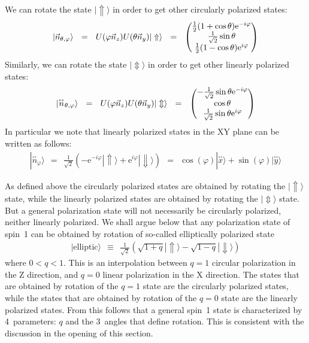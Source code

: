 \documentclass[onecolumn,fleqn, 11pt]{revtex4}
\newcommand{\vecm}[1]{\overset{{}_{\leftrightarrow}}{#1}}
\newcommand{\eexp}{\mathrm{e}^}
\newcommand{\amatrix}[1]{\begin{matrix} #1 \end{matrix}}
\newcommand{\beq}{\begin{eqnarray}}
\newcommand{\eeq}{\end{eqnarray}}
\begin{document}
We can rotate the state ${| \Uparrow \rangle }$ 
in order to get other circularly polarized states:
\beq
|\vec{n}_{\theta,\varphi}\rangle 
\ \ = \ \ U( \varphi \vec{n}_z) U(\theta \vec{n}_y) | \Uparrow \rangle 
\ \ = \ \ \left( 
\amatrix{ 
\frac{1}{2}(1+\cos \theta) \eexp{-i \varphi} \cr 
\frac{1}{\sqrt{2}}\sin \theta \cr 
\frac{1}{2}(1-\cos \theta) \eexp{i \varphi} } 
\right) 
\eeq
Similarly, we can rotate the state ${| \Updownarrow \rangle }$ 
in order to get other linearly polarized states:
\beq
|\vecm{n}_{\theta,\varphi}\rangle
\ \ = \ \ U( \varphi \vec{n}_z) U(\theta \vec{n}_y) | \Updownarrow \rangle 
\ \ = \ \ \left(\amatrix{ 
-\frac{1}{\sqrt{2}}\sin \theta \eexp{-i \varphi} \cr 
\cos \theta \cr 
\frac{1}{\sqrt{2}}\sin \theta \eexp{i \varphi} } 
\right) 
\eeq
In particular we note that linearly polarized states in the XY plane 
can be written as follows:
\beq
|\vecm{n}_{\varphi}\rangle
\ \ = \ \ \frac{1}{\sqrt{2}}(- \eexp{-i \varphi} | \Uparrow \rangle + \eexp{i \varphi} | \Downarrow \rangle ) 
\ \ = \ \ \cos(\varphi) | \vecm{x} \rangle + \sin(\varphi) | \vecm{y} \rangle 
\eeq 



As defined above the circularly polarized states 
are obtained by rotating the ${| \Uparrow \rangle}$  
state, while the linearly polarized states are obtained 
by rotating the ${| \Updownarrow \rangle}$ state.
But a general polarization state will not necessarily 
be circularly polarized, neither linearly polarized.  
We shall argue below that any polarization state 
of spin~1 can be obtained by rotation of so-called
elliptically polarized state 
\beq
|\text{elliptic}\rangle \ \ \equiv \ \ \frac{1}{\sqrt{2}} \left(\sqrt{1+q}| \Uparrow \rangle - \sqrt{1-q}| \Downarrow \rangle \right)
\eeq
where $0<q<1$.
This is an interpolation between ${q=1}$ circular polarization in the Z direction, 
and ${q=0}$ linear polarization in the X direction.  
The states that are obtained by rotation of the $q=1$ state are the circularly polarized states, 
while the states that are obtained by rotation of the $q=0$ state are the linearly polarized states. 
From this follows that a general spin~1 state is 
characterized by 4~parameters: $q$ and the 3~angles
that define rotation.  This is consistent with the 
discussion in the opening of this section.
\end{document}
